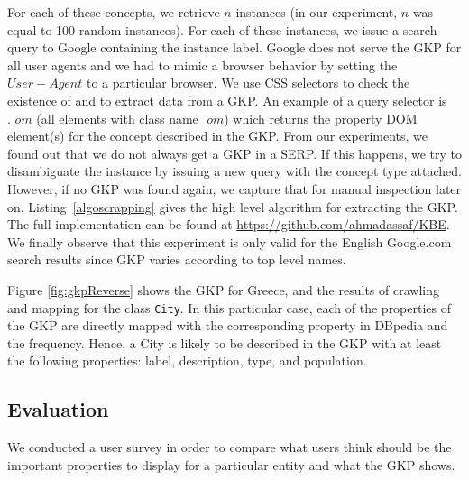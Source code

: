 For each of these concepts, we retrieve $n$ instances (in our experiment, $n$ was equal to 100 random instances). For each of these instances, we issue a search query to Google containing the instance label. Google does not serve the GKP for all user agents and we had to mimic a browser behavior by setting the $User-Agent$ to a particular browser. We use CSS selectors to check the existence of and to extract data from a GKP. An example of a query selector is $.\_om$ (all elements with class name $\_om$) which returns the property DOM element(s) for the concept described in the GKP. From our experiments, we found out that we do not always get a GKP in a SERP. If this happens, we try to disambiguate the instance by issuing a new query with the concept type attached. However, if no GKP was found again, we capture that for manual inspection later on. Listing~\ref{algoscrapping} gives the high level algorithm for extracting the GKP. The full implementation can be found at \url{https://github.com/ahmadassaf/KBE}. We finally observe that this experiment is only valid for the English Google.com search results since GKP varies according to top level names.

Figure \ref{fig:gkpReverse} shows the GKP for Greece, and the results of crawling and mapping for the class \texttt{City}. In this particular case, each of the properties of the GKP are directly mapped with the corresponding property in DBpedia and the frequency. Hence, a City is likely to be described in the GKP with at least the following properties: label, description, type, and population. 


\subsection{Evaluation}
\label{sec:evaluation}
We conducted a user survey in order to compare what users think should be the important properties to display for a particular entity and what the GKP shows.

